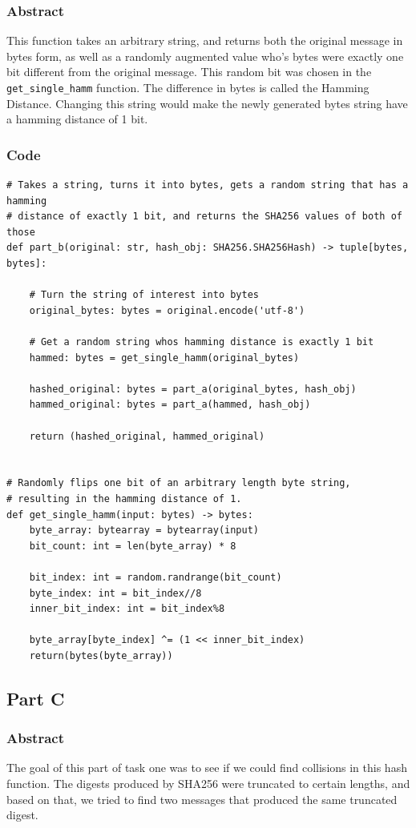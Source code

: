 \documentclass[11pt]{article}
\begin{document}
\subsubsection*{Abstract}
This function takes an arbitrary string, and returns both the original message in bytes form, as well as a randomly augmented value who's bytes were exactly one bit different from the original message. This random bit was chosen in the \verb|get_single_hamm| function. The difference in bytes is called the Hamming Distance. Changing this string would make the newly generated bytes string have a hamming distance of 1 bit. 

\subsubsection*{Code}
\begin{lstlisting}
# Takes a string, turns it into bytes, gets a random string that has a hamming
# distance of exactly 1 bit, and returns the SHA256 values of both of those
def part_b(original: str, hash_obj: SHA256.SHA256Hash) -> tuple[bytes, bytes]:

    # Turn the string of interest into bytes
    original_bytes: bytes = original.encode('utf-8')

    # Get a random string whos hamming distance is exactly 1 bit
    hammed: bytes = get_single_hamm(original_bytes)
    
    hashed_original: bytes = part_a(original_bytes, hash_obj)
    hammed_original: bytes = part_a(hammed, hash_obj)

    return (hashed_original, hammed_original)


# Randomly flips one bit of an arbitrary length byte string, 
# resulting in the hamming distance of 1.
def get_single_hamm(input: bytes) -> bytes:
    byte_array: bytearray = bytearray(input)
    bit_count: int = len(byte_array) * 8

    bit_index: int = random.randrange(bit_count)
    byte_index: int = bit_index//8
    inner_bit_index: int = bit_index%8

    byte_array[byte_index] ^= (1 << inner_bit_index)
    return(bytes(byte_array))
\end{lstlisting}

\subsection*{Part C}
\subsubsection*{Abstract}
The goal of this part of task one was to see if we could find collisions in this hash function. The digests produced by SHA256 were truncated to certain lengths, and based on that, we tried to find two messages that produced the same truncated digest. 
\end{document}

